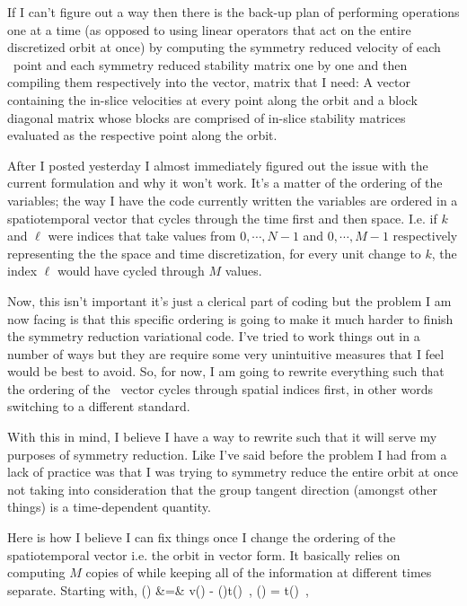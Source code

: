 If I can't figure out a way then there is the back-up
plan of performing operations one at a time (as opposed to using
linear operators that act on the entire discretized orbit at once)
by computing the symmetry reduced velocity of each \statesp\ point and each symmetry reduced
stability matrix one by one and then compiling them respectively into the vector, matrix that I need:
A vector containing the in-slice velocities at every point along the orbit and a block
diagonal matrix whose blocks are comprised of in-slice stability matrices evaluated as the
respective point along the orbit.

After I posted yesterday I almost immediately figured out the issue with the current formulation and why it won't work. It's a matter
of the ordering of the variables; the way I have the code currently written the variables are ordered in a spatiotemporal vector
that cycles through the time first and then space. I.e. if $k$ and $\ell$ were indices that take values from $0, \cdots, N-1$
and $0, \cdots, M-1$ respectively representing the the space and time discretization, for every unit change to $k$, the index
$\ell$ would have cycled through $M$ values.

Now, this isn't important it's just a clerical part of coding but the problem I am now facing is that this specific ordering
is going to make it much harder to finish the symmetry reduction variational code. I've tried to work things out
in a number of ways but they are require some very unintuitive measures that I feel would be best to avoid. So, for now,
I am going to rewrite everything such that the ordering of the \statesp\ vector cycles through spatial indices first, in other
words switching to a different standard.

With this in mind, I believe I have a way to rewrite  such that it will serve my purposes of symmetry reduction.
Like I've said before the problem I had from a lack of practice was that I was trying to symmetry reduce the entire orbit at
once not taking into consideration that the group tangent direction (amongst other things) is a time-dependent quantity.

Here is how I believe I can fix things once I change the ordering of the spatiotemporal vector i.e. the orbit in vector form.
It basically relies on computing $M$ copies of  while keeping all of the information at different times separate.
Starting with,
\bea \nonumber
    () &=&
                v() - \dot{\theta}()t() \,, \quad
    \dot{\theta}() =
                 t()    \,, \quad
\eea

